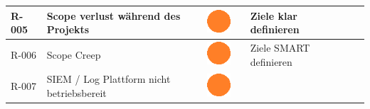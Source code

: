 \begin{landscape}
\begin{table}[]
{\begin{tabular}{lllllll}
R-005                                                                       & Scope verlust während des Projekts                                                                                                         & \multicolumn{1}{c}{{\includegraphics[width=0.03\linewidth]{source/status_report/main/risk_warning}}}                     &                         & Ziele klar definieren                                                                                                                                 &                                                                                                                                                                            &                                                                                                                        \\ \hline
R-006                                                                       & Scope Creep                                                                                                                                & \multicolumn{1}{c}{{\includegraphics[width=0.03\linewidth]{source/status_report/main/risk_warning}}}                     &                         & Ziele SMART definieren                                                                                                                                &                                                                                                                                                                            &                                                                                                                        \\ \hline
R-007                                                                       & SIEM / Log Plattform nicht betriebsbereit                                                                                                  & \multicolumn{1}{c}{{\includegraphics[width=0.03\linewidth]{source/status_report/main/risk_warning}}}                     &                         &                                                                                                                                                       &                                                                                                                                                                            &                                                                                                                        \\ \hline

\end{tabular}}
\end{table}
\end{landscape}
